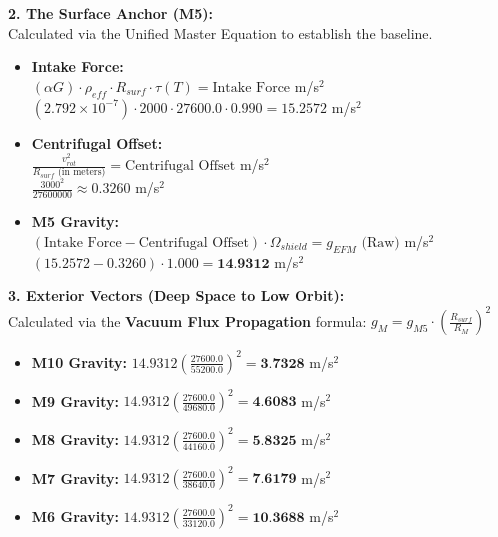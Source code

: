 \documentclass[11pt, a4paper]{article}
\begin{document}
  \vspace{1.0em}
  \noindent \textbf{2. The Surface Anchor (M5):} \\
  \hspace*{1em} Calculated via the Unified Master Equation to establish the baseline.
  \begin{itemize}
    \item \textbf{Intake Force:} \\[0.5em]
    \hspace*{2em} $(\alpha G) \cdot \rho_{eff} \cdot R_{surf} \cdot \tau(T) = \text{Intake Force}$ m/s$^2$ \\[1em]
    \hspace*{2em} $(2.792 \times 10^{-7}) \cdot 2000 \cdot 27600.0 \cdot 0.990 = 15.2572$ m/s$^2$
    
    \item \textbf{Centrifugal Offset:} \\[0.5em]
    \hspace*{2em} $\frac{v_{rot}^2}{R_{surf} \text{ (in meters)}} = \text{Centrifugal Offset}$ m/s$^2$ \\[1em]
    \hspace*{2em} $\frac{3000^2}{27600000} \approx 0.3260$ m/s$^2$
    
    \item \textbf{M5 Gravity:} \\[0.5em]
    \hspace*{2em} $(\text{Intake Force} - \text{Centrifugal Offset}) \cdot \Omega_{shield} = g_{EFM} \text{ (Raw)}$ m/s$^2$ \\[1em]
    \hspace*{2em} $(15.2572 - 0.3260) \cdot 1.000 = \textbf{14.9312}$ m/s$^2$
  \end{itemize}

  \clearpage
  \noindent \textbf{3. Exterior Vectors (Deep Space to Low Orbit):} \\
  \hspace*{1em} Calculated via the \textbf{Vacuum Flux Propagation} formula: $g_M = g_{M5} \cdot \left( \frac{R_{surf}}{R_M} \right)^2$
  \begin{itemize}
    \item \textbf{M10 Gravity:} $14.9312 \left( \frac{27600.0}{55200.0} \right)^2 = \textbf{3.7328}$ m/s$^2$
    \item \textbf{M9 Gravity:} $14.9312 \left( \frac{27600.0}{49680.0} \right)^2 = \textbf{4.6083}$ m/s$^2$
    \item \textbf{M8 Gravity:} $14.9312 \left( \frac{27600.0}{44160.0} \right)^2 = \textbf{5.8325}$ m/s$^2$
    \item \textbf{M7 Gravity:} $14.9312 \left( \frac{27600.0}{38640.0} \right)^2 = \textbf{7.6179}$ m/s$^2$
    \item \textbf{M6 Gravity:} $14.9312 \left( \frac{27600.0}{33120.0} \right)^2 = \textbf{10.3688}$ m/s$^2$
  \end{itemize}
\end{document}
